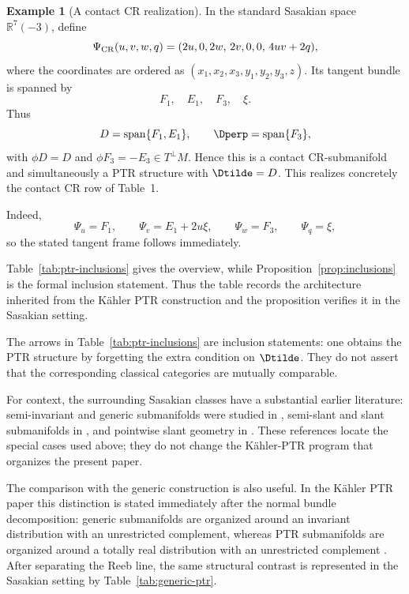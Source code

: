 \documentclass[11pt]{article}
\theoremstyle{definition}\newtheorem{definition}[theorem]{Definition}\newtheorem{example}[theorem]{Example}
\theoremstyle{remark}\newtheorem{remark}[theorem]{Remark}
\begin{document}
\begin{example}[A contact CR realization]\label{ex:contactCR-coordinate}
In the standard Sasakian space \(\mathbb R^{7}(-3)\), define
\[
\Psi_{\rm CR}(u,v,w,q)
=
(2u,0,2w,\,2v,0,0,\,4uv+2q),
\]
where the coordinates are ordered as
\((x_1,x_2,x_3,y_1,y_2,y_3,z)\).  Its tangent bundle is spanned by
\[
F_1,\quad E_1,\quad F_3,\quad \xi .
\]
Thus
\[
D=\operatorname{span}\{F_1,E_1\},\qquad
\Dperp=\operatorname{span}\{F_3\},
\]
with \(\phi D=D\) and \(\phi F_3=-E_3\in T^\perp M\).  Hence this is a
contact CR-submanifold and simultaneously a PTR structure with
\(\Dtilde=D\).  This realizes concretely the contact CR row of Table~1.

Indeed,
\[
\Psi_u=F_1,\qquad
\Psi_v=E_1+2u\xi,\qquad
\Psi_w=F_3,\qquad
\Psi_q=\xi,
\]
so the stated tangent frame follows immediately.
\end{example}


Table~\ref{tab:ptr-inclusions} gives the overview, while
Proposition~\ref{prop:inclusions} is the formal inclusion statement.
Thus the table records the architecture inherited from the K\"ahler PTR
construction and the proposition verifies it in the Sasakian setting.


The arrows in Table~\ref{tab:ptr-inclusions} are inclusion statements:
one obtains the PTR structure by forgetting the extra condition on
\(\Dtilde\).  They do not assert that the corresponding classical
categories are mutually comparable.

For context, the surrounding Sasakian classes have a substantial earlier
literature: semi-invariant and generic submanifolds were studied in
\cite{BejancuPapaghiuc1981,YanoKon1980}, semi-slant and slant
submanifolds in \cite{Cabrerizo1999,Cabrerizo2000}, and pointwise slant
geometry in \cite{Park2020}.  These references locate the special cases
used above; they do not change the K\"ahler-PTR program that organizes the
present paper.

The comparison with the generic construction is also useful.  In the
K\"ahler PTR paper this distinction is stated immediately after the normal
bundle decomposition: generic submanifolds are organized around an
invariant distribution with an unrestricted complement, whereas PTR
submanifolds are organized around a totally real distribution with an
unrestricted complement \cite{PoyrazSahinYerlikaya2025}.  After separating
the Reeb line, the same structural contrast is represented in the
Sasakian setting by Table~\ref{tab:generic-ptr}.
\end{document}

